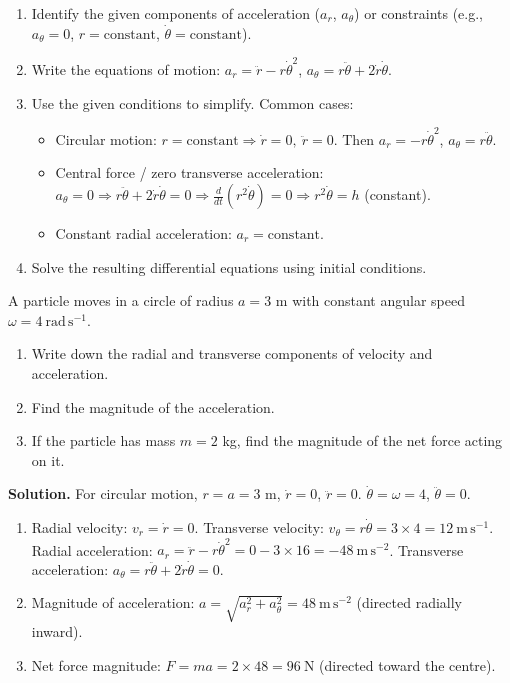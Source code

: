 \documentclass[11pt]{article}
\begin{document}
\begin{methode}
\begin{enumerate}
\item Identify the given components of acceleration ($a_r$, $a_\theta$) or constraints (e.g., $a_\theta = 0$, $r = \text{constant}$, $\dot{\theta} = \text{constant}$).
\item Write the equations of motion:
$a_r = \ddot{r} - r\dot{\theta}^2$,
$a_\theta = r\ddot{\theta} + 2\dot{r}\dot{\theta}$.
\item Use the given conditions to simplify. Common cases:
\begin{itemize}
\item Circular motion: $r = \text{constant} \Rightarrow \dot{r}=0,\ \ddot{r}=0$. Then $a_r = -r\dot{\theta}^2$, $a_\theta = r\ddot{\theta}$.
\item Central force / zero transverse acceleration: $a_\theta = 0 \Rightarrow r\ddot{\theta} + 2\dot{r}\dot{\theta} = 0 \Rightarrow \frac{d}{dt}(r^2\dot{\theta}) = 0 \Rightarrow r^2\dot{\theta} = h$ (constant).
\item Constant radial acceleration: $a_r = \text{constant}$.
\end{itemize}
\item Solve the resulting differential equations using initial conditions.
\end{enumerate}
\end{methode}

\begin{exoresolu}
A particle moves in a circle of radius $a = 3$ m with constant angular speed $\omega = 4\ \mathrm{rad\,s^{-1}}$.
\begin{enumerate}
\item Write down the radial and transverse components of velocity and acceleration.
\item Find the magnitude of the acceleration.
\item If the particle has mass $m = 2$ kg, find the magnitude of the net force acting on it.
\end{enumerate}
\tcblower
\textbf{Solution.}
For circular motion, $r = a = 3$ m, $\dot{r} = 0$, $\ddot{r} = 0$. $\dot{\theta} = \omega = 4$, $\ddot{\theta} = 0$.
\begin{enumerate}
\item Radial velocity: $v_r = \dot{r} = 0$.
Transverse velocity: $v_\theta = r\dot{\theta} = 3 \times 4 = 12\ \mathrm{m\,s^{-1}}$.
Radial acceleration: $a_r = \ddot{r} - r\dot{\theta}^2 = 0 - 3 \times 16 = -48\ \mathrm{m\,s^{-2}}$.
Transverse acceleration: $a_\theta = r\ddot{\theta} + 2\dot{r}\dot{\theta} = 0$.
\item Magnitude of acceleration: $a = \sqrt{a_r^2 + a_\theta^2} = 48\ \mathrm{m\,s^{-2}}$ (directed radially inward).
\item Net force magnitude: $F = m a = 2 \times 48 = 96\ \mathrm{N}$ (directed toward the centre).
\end{enumerate}
\end{exoresolu}
\end{document}
